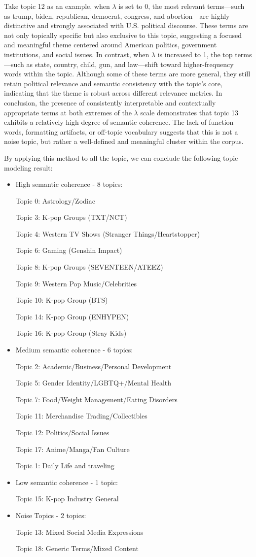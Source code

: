 \documentclass[12pt]{article}
\begin{document}
	Take topic 12 as an example, when $\lambda$ is set to 0, the most relevant terms—such as trump, biden, republican, democrat, congress, and abortion—are highly distinctive and strongly associated with U.S. political discourse. These terms are not only topically specific but also exclusive to this topic, suggesting a focused and meaningful theme centered around American politics, government institutions, and social issues.	In contrast, when $\lambda$ is increased to 1, the top terms—such as state, country, child, gun, and law—shift toward higher-frequency words within the topic. Although some of these terms are more general, they still retain political relevance and semantic consistency with the topic’s core, indicating that the theme is robust across different relevance metrics. In conclusion, the presence of consistently interpretable and contextually appropriate terms at both extremes of the $\lambda$ scale demonstrates that topic 13 exhibits a relatively high degree of semantic coherence. The lack of function words, formatting artifacts, or off-topic vocabulary suggests that this is not a noise topic, but rather a well-defined and meaningful cluster within the corpus.
	
	By applying this method to all the topic, we can conclude the following topic modeling result:
	\begin{itemize}
	\item High semantic coherence - 8 topics:
	
		Topic 0: Astrology/Zodiac
		
		Topic 3: K-pop Groups (TXT/NCT)
		
		Topic 4: Western TV Shows (Stranger Things/Heartstopper)
		
		Topic 6: Gaming (Genshin Impact)
		
		Topic 8: K-pop Groups (SEVENTEEN/ATEEZ)
		
		Topic 9: Western Pop Music/Celebrities
		
		Topic 10: K-pop Group (BTS)
		
		Topic 14: K-pop Group (ENHYPEN)
		
		Topic 16: K-pop Group (Stray Kids)
	\item 	Medium semantic coherence - 6 topics:
	
		Topic 2: Academic/Business/Personal Development
		
		Topic 5: Gender Identity/LGBTQ+/Mental Health
		
		Topic 7: Food/Weight Management/Eating Disorders
		
		Topic 11: Merchandise Trading/Collectibles
		
		Topic 12: Politics/Social Issues
		
		Topic 17: Anime/Manga/Fan Culture
		
		Topic 1: Daily Life and traveling
	\item 	Low semantic coherence - 1 topic:
	
		Topic 15: K-pop Industry General
	\item Noise Topics - 2 topics:
	
		Topic 13: Mixed Social Media Expressions
		
		Topic 18: Generic Terms/Mixed Content
	\end{itemize}
	
\end{document}
